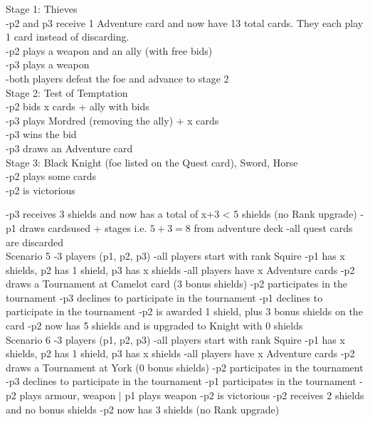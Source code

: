\documentclass[12pt]{article} %
\begin{document}
	\begin{addmargin}[1cm]{0em}
	Stage 1: Thieves\\
	-p2 and p3 receive 1 Adventure card and now have 13 total cards. They each play 1 card instead of discarding.\\
	-p2 plays a weapon and an ally (with free bids)\\
	-p3 plays a weapon\\
	-both players defeat the foe and advance to stage 2\\
	
	Stage 2: Test of Temptation\\
	-p2 bids x cards + ally with bids\\
	-p3 plays Mordred (removing the ally) + x cards\\
	-p3 wins the bid\\
	-p3 draws an Adventure card\\
	
	Stage 3: Black Knight (foe listed on the Quest card), Sword, Horse\\
	-p2 plays some cards\\
	-p2 is victorious\\
	\end{addmargin}

\bgroup\obeylines
-p3 receives 3 shields and now has a total of x+3 < 5 shields (no Rank upgrade)
-p1 draws cardsused + stages i.e. $5 + 3 = 8$ from adventure deck
-all quest cards are discarded\\

Scenario 5
-3 players (p1, p2, p3)
-all players start with rank Squire
-p1 has x shields, p2 has 1 shield, p3 has x shields
-all players have x Adventure cards
-p2 draws a Tournament at Camelot card (3 bonus shields)
-p2 participates in the tournament
-p3 declines to participate in the tournament
-p1 declines to participate in the tournament
-p2 is awarded 1 shield, plus 3 bonus shields on the card
-p2 now has 5 shields and is upgraded to Knight with 0 shields\\

Scenario 6
-3 players (p1, p2, p3)
-all players start with rank Squire
-p1 has x shields, p2 has 1 shield, p3 has x shields
-all players have x Adventure cards
-p2 draws a Tournament at York (0 bonus shields)
-p2 participates in the tournament
-p3 declines to participate in the tournament
-p1 participates in the tournament
-p2 plays armour, weapon $|$ p1 plays weapon
-p2 is victorious
-p2 receives 2 shields and no bonus shields
-p2 now has 3 shields (no Rank upgrade)\\
\end{document}

